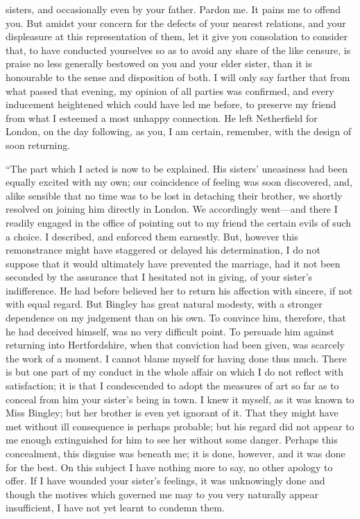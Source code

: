 sisters, and occasionally even by your father.  Pardon me.  It
pains me to offend you.  But amidst your concern for the defects
of  your nearest relations, and your displeasure at this
representation of them, let it give you consolation to consider
that, to have conducted yourselves so as to avoid any share of
the like censure, is praise no less generally bestowed on you and
your elder sister, than it is honourable to the sense and
disposition of both.  I will only say farther that from what passed
that evening, my opinion of all parties was confirmed, and every
inducement heightened which could have led me before, to
preserve my friend from what I esteemed a most unhappy
connection.  He left Netherfield for London, on the day
following, as you, I am certain, remember, with the design of
soon returning.

``The part which I acted is now to be explained.  His sisters'
uneasiness had been equally excited with my own; our coincidence
of feeling was soon discovered, and, alike sensible that no time
was to be lost in detaching their brother, we shortly resolved
on joining him directly in London.  We accordingly went---and
there I readily engaged in the office of pointing out to my
friend the certain evils of such a choice.  I described, and
enforced them earnestly.  But, however this remonstrance might
have staggered or delayed his determination, I do not suppose
that it would ultimately have prevented the marriage, had it not
been seconded by the assurance that I hesitated not in giving, of
your sister's indifference.  He had before believed her to return
his affection with sincere, if not with equal regard.  But Bingley
has great natural modesty, with a stronger dependence on my
judgement than on his own.  To convince him, therefore, that he
had deceived himself, was no very difficult point.  To persuade
him against returning into Hertfordshire, when that conviction
had been given, was scarcely the work of a moment.  I cannot
blame myself for having done thus much.  There is but one part
of my conduct in the whole affair on which I do not reflect with
satisfaction; it is that I condescended to adopt the measures of
art so far as to conceal from him your sister's being in town.  I
knew it myself, as it was known to Miss Bingley; but her brother
is even yet ignorant of it.  That they might have met without ill
consequence is perhaps probable; but his regard did not appear
to me enough extinguished for him to see her without some danger.
Perhaps this concealment, this disguise was beneath me; it is
done, however, and it was done for the best.  On this subject
I have nothing more to say, no other apology to offer.  If I
have wounded your sister's feelings, it was unknowingly done and
though the motives which governed me may to you very naturally
appear insufficient, I have not yet learnt to condemn them.

